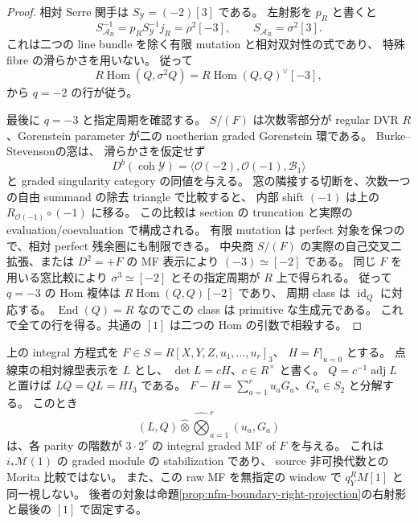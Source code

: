 \begin{proof}
相対 Serre 関手は $S_{\mathcal Y}=(-2)[3]$ である。
左射影を $p_R$ と書くと
\[
 S_{\mathcal A_R}^{-1}=p_RS_{\mathcal Y}^{-1}j_R
 =\rho^2[-3],\qquad S_{\mathcal A_R}=\sigma^2[3].
\]
これは二つの line bundle を除く有限 mutation と相対双対性の式であり、
特殊 fibre の滑らかさを用いない。
従って
\[
 R\operatorname{Hom}(Q,\sigma^2Q)
 =R\operatorname{Hom}(Q,Q)^\vee[-3],
\]
から $q=-2$ の行が従う。

最後に $q=-3$ と指定周期を確認する。
$S/(F)$ は次数零部分が regular DVR $R$、Gorenstein parameter が二の
noetherian graded Gorenstein 環である。
Burke--Stevenson\cite[Theorem~6.4(1), $i=1$]{NFMBurkeStevenson}の窓は、
滑らかさを仮定せず
\[
 D^b(\operatorname{coh}\mathcal Y)
 =\langle\mathcal O(-2),\mathcal O(-1),\mathcal B_1\rangle
\]
と graded singularity category の同値を与える。
窓の隣接する切断を、次数一つの自由 summand の除去 triangle で比較すると、
内部 shift $(-1)$ は上の $R_{\mathcal O(-1)}\circ(-1)$ に移る。
この比較は section の truncation と実際の evaluation/coevaluation で構成される。
有限 mutation は perfect 対象を保つので、相対 perfect 残余圏にも制限できる。
中央商 $S/(F)$ の実際の自己交叉二拡張、または $D^2=+F$ の MF 表示により
$(-3)\simeq[-2]$ である。
同じ $F$ を用いる窓比較により
$\sigma^3\simeq[-2]$ とその指定周期が $R$ 上で得られる。
従って $q=-3$ の Hom 複体は $R\operatorname{Hom}(Q,Q)[-2]$ であり、
周期 class は $\operatorname{id}_Q$ に対応する。
$\operatorname{End}(Q)=R$ なのでこの class は primitive な生成元である。
これで全ての行を得る。共通の $[1]$ は二つの Hom の引数で相殺する。
\end{proof}

\begin{lemma}[点線束の線型表示からの明示的な三次 MF]
\label{lem:nfm-boundary-line-mf}
上の integral 方程式を $F\in S=R[X,Y,Z,u_1,\ldots,u_r]_3$、
$H=F|_{u=0}$ とする。
点線束の相対線型表示を $L$ とし、
$\det L=cH$、$c\in R^\times$ と書く。
$Q=c^{-1}\operatorname{adj}L$ と置けば $LQ=QL=H I_3$ である。
$F-H=\sum_{a=1}^r u_aG_a$、$G_a\in S_2$ と分解する。
このとき
\[
 (L,Q)\mathbin{\widehat\otimes}
       \widehat{\bigotimes}_{a=1}^r(u_a,G_a)
\]
は、各 parity の階数が $3\cdot2^r$ の integral graded MF of $F$ を与える。
これは $i_*\mathcal M(1)$ の graded module の stabilization であり、
source 非可換代数との Morita 比較ではない。
また、この raw MF を無指定の window で $q_Y^RM[1]$ と同一視しない。
後者の対象は命題\ref{prop:nfm-boundary-right-projection}の右射影と最後の $[1]$ で固定する。
\end{lemma}

